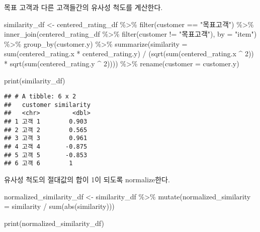 \documentclass[
]{book}
\newenvironment{Shaded}{\begin{snugshade}}{\end{snugshade}}
\newcommand{\AttributeTok}[1]{\textcolor[rgb]{0.77,0.63,0.00}{#1}}
\newcommand{\DecValTok}[1]{\textcolor[rgb]{0.00,0.00,0.81}{#1}}
\newcommand{\FunctionTok}[1]{\textcolor[rgb]{0.00,0.00,0.00}{#1}}
\newcommand{\NormalTok}[1]{#1}
\newcommand{\OtherTok}[1]{\textcolor[rgb]{0.56,0.35,0.01}{#1}}
\newcommand{\SpecialCharTok}[1]{\textcolor[rgb]{0.00,0.00,0.00}{#1}}
\newcommand{\StringTok}[1]{\textcolor[rgb]{0.31,0.60,0.02}{#1}}
\begin{document}
목표 고객과 다른 고객들간의 유사성 척도를 계산한다.

\begin{Shaded}
\begin{Highlighting}[]
\NormalTok{similarity\_df }\OtherTok{\textless{}{-}}\NormalTok{ centered\_rating\_df }\SpecialCharTok{\%\textgreater{}\%} \FunctionTok{filter}\NormalTok{(customer }\SpecialCharTok{==} \StringTok{"목표고객"}\NormalTok{) }\SpecialCharTok{\%\textgreater{}\%} 
  \FunctionTok{inner\_join}\NormalTok{(centered\_rating\_df }\SpecialCharTok{\%\textgreater{}\%} \FunctionTok{filter}\NormalTok{(customer }\SpecialCharTok{!=} \StringTok{"목표고객"}\NormalTok{), }\AttributeTok{by =} \StringTok{"item"}\NormalTok{) }\SpecialCharTok{\%\textgreater{}\%}
  \FunctionTok{group\_by}\NormalTok{(customer.y) }\SpecialCharTok{\%\textgreater{}\%}
  \FunctionTok{summarize}\NormalTok{(}\AttributeTok{similarity =} \FunctionTok{sum}\NormalTok{(centered\_rating.x }\SpecialCharTok{*}\NormalTok{ centered\_rating.y) }\SpecialCharTok{/}
\NormalTok{              (}\FunctionTok{sqrt}\NormalTok{(}\FunctionTok{sum}\NormalTok{(centered\_rating.x }\SpecialCharTok{\^{}} \DecValTok{2}\NormalTok{)) }\SpecialCharTok{*} \FunctionTok{sqrt}\NormalTok{(}\FunctionTok{sum}\NormalTok{(centered\_rating.y }\SpecialCharTok{\^{}} \DecValTok{2}\NormalTok{)))) }\SpecialCharTok{\%\textgreater{}\%}
  \FunctionTok{rename}\NormalTok{(}\AttributeTok{customer =}\NormalTok{ customer.y)}

\FunctionTok{print}\NormalTok{(similarity\_df)}
\end{Highlighting}
\end{Shaded}

\begin{verbatim}
## # A tibble: 6 x 2
##   customer similarity
##   <chr>         <dbl>
## 1 고객 1        0.903
## 2 고객 2        0.565
## 3 고객 3        0.961
## 4 고객 4       -0.875
## 5 고객 5       -0.853
## 6 고객 6        1
\end{verbatim}

유사성 척도의 절대값의 합이 1이 되도록 normalize한다.

\begin{Shaded}
\begin{Highlighting}[]
\NormalTok{normalized\_similarity\_df }\OtherTok{\textless{}{-}}\NormalTok{ similarity\_df }\SpecialCharTok{\%\textgreater{}\%}
  \FunctionTok{mutate}\NormalTok{(}\AttributeTok{normalized\_similarity =}\NormalTok{ similarity }\SpecialCharTok{/} \FunctionTok{sum}\NormalTok{(}\FunctionTok{abs}\NormalTok{(similarity)))}

\FunctionTok{print}\NormalTok{(normalized\_similarity\_df)}
\end{Highlighting}
\end{Shaded}
\end{document}
